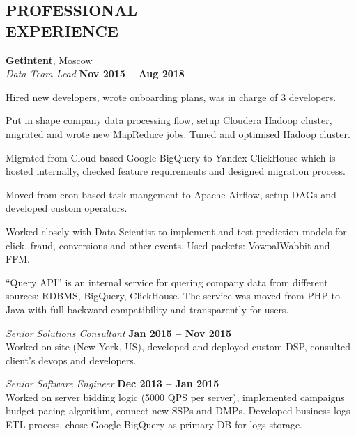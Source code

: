 \documentclass[margin,line]{resume}
\begin{document}
\begin{resume}
    \section{\mysidestyle \textbf{\large{P}\small{ROFESSIONAL\\EXPERIENCE}}}

    \textbf{\listing Getintent}, Moscow \vspace{2mm}\\\vspace{1mm}%
    \textsl{Data Team Lead} \hfill \textbf{Nov 2015 – Aug 2018}\\
    \begin{list2}
    \item Hired new developers, wrote onboarding plans, was in charge of 3 developers.
    \item Put in shape company data processing flow, setup Cloudera Hadoop cluster, migrated and wrote new MapReduce jobs. Tuned and optimised Hadoop cluster.
    \item Migrated from Cloud based Google BigQuery to Yandex ClickHouse which is hosted internally, checked feature requirements and designed migration process.
    \item Moved from cron based task mangement to Apache Airflow, setup DAGs and developed custom operators.
    \item Worked closely with Data Scientist to implement and test prediction models for click, fraud, conversions and other events. Used packets: VowpalWabbit and FFM.
    \item ``Query API'' is an internal service for quering company data from different sources: RDBMS, BigQuery, ClickHouse. The service was moved from PHP to Java with full backward compatibility and transparently for users. 
    \end{list2}\vspace{1mm}

    \textsl{Senior Solutions Consultant} \vspace{2mm}\hfill \textbf{Jan 2015 – Nov 2015}\\
    Worked on site (New York, US), developed and deployed custom DSP, consulted client's devops and developers. \vspace{1mm}

    \textsl{Senior Software Engineer} \vspace{2mm}\hfill \textbf{Dec 2013 – Jan 2015}\\
   Worked on server bidding logic (5000 QPS per server), implemented campaigns budget pacing algorithm, connect new SSPs and DMPs. Developed business logs ETL process, chose Google BigQuery as primary DB for logs storage.


\end{resume}
\end{document}
